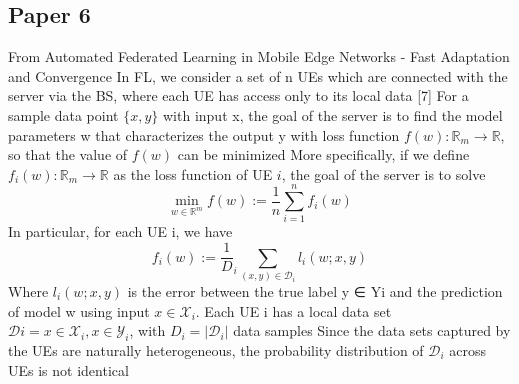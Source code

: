 \subsection{Paper 6}
From Automated Federated Learning in Mobile Edge Networks - Fast Adaptation and Convergence
In FL, we consider a set of n UEs which are connected with the server via the BS, where each UE has access only to its local data [7] For a sample data point $\{x, y\}$ with input x, the goal of the server is to find the model parameters w that characterizes the output y with loss function $f(w):\mathbb{R}_m \rightarrow \mathbb{R}$, so that the value of $f(w)$ can be minimized More specifically, if we define $f_i(w):\mathbb{R}_m \rightarrow \mathbb{R}$ as the loss function of UE $i$, the goal of the server is to solve
\begin{equation*}
    \min_{w\in\mathbb{R}^m}f(w):=\frac1n\sum_{i=1}^n f_i(w)
\end{equation*}
In particular, for each UE i, we have
\begin{equation*}
    f_i(w):=\frac1D_i\sum_{(x,y)\in\mathcal{D}_i} l_i(w;x,y)
\end{equation*}
Where $l_i(w;x,y)$ is the error between the true label y ∈ Yi and the prediction of model w using input $x\in\mathcal{X}_i$. Each UE i has a local data set $\mathcal{D}i ={x\in\mathcal{X}_i, x\in\mathcal{Y}_i}$, with $D_i =|\mathcal{D}_i|$ data samples Since the data sets captured by the UEs are naturally heterogeneous, the probability distribution of $\mathcal{D}_i$ across UEs is not identical

